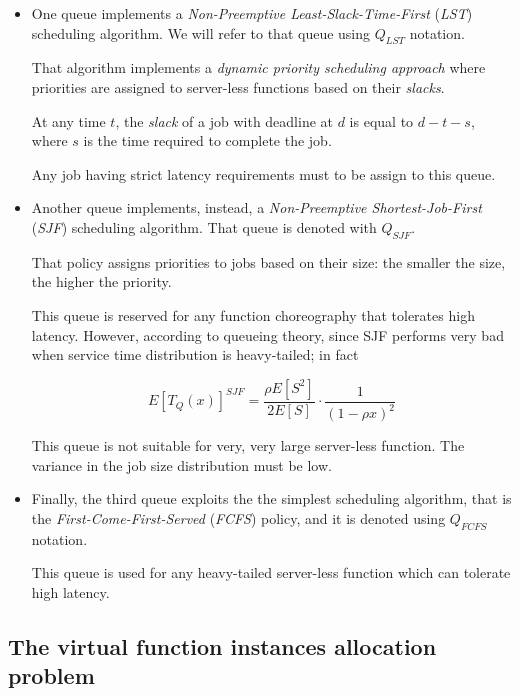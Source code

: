 \documentclass[10pt,a4paper]{article}
\theoremstyle{definition}
\begin{document}
\begin{itemize}

\item One queue implements a \textit{Non-Preemptive Least-Slack-Time-First} (\textit{LST}) scheduling algorithm. We will refer to that queue using $Q_{LST}$ notation.

That algorithm implements a \textit{dynamic priority scheduling approach} where priorities are assigned to server-less functions based on their \textit{slacks}.

At any time $t$, the \textit{slack} of a job with deadline at $d$ is equal to $d - t - s$, where $s$ is the time required to complete the job. 

Any job having strict latency requirements must to be assign to this queue.

\item Another queue implements, instead, a \textit{Non-Preemptive Shortest-Job-First} (\textit{SJF}) scheduling algorithm. That queue is denoted with $Q_{SJF}$.

That policy assigns priorities to jobs based on their size: the smaller the size, the higher the priority.

This queue is reserved for any function choreography that tolerates high latency. However, according to queueing theory, since SJF performs very bad when service time distribution is heavy-tailed; in fact

\begin{equation}
E[T_Q(x)]^{SJF} = \dfrac{\rho E[S^2]}{2E [S]} \cdot \dfrac{1}{(1 - \rho x )^2}
\end{equation}

This queue is not suitable for very, very large server-less function. The variance in the job size distribution must be low.

\item Finally, the third queue exploits the the simplest scheduling algorithm, that is the \textit{First-Come-First-Served} (\textit{FCFS}) policy, and it is denoted using $Q_{FCFS}$ notation.

This queue is used for any heavy-tailed server-less function which can tolerate high latency.
\end{itemize}


\subsection{The virtual function instances allocation problem}
\end{document}
